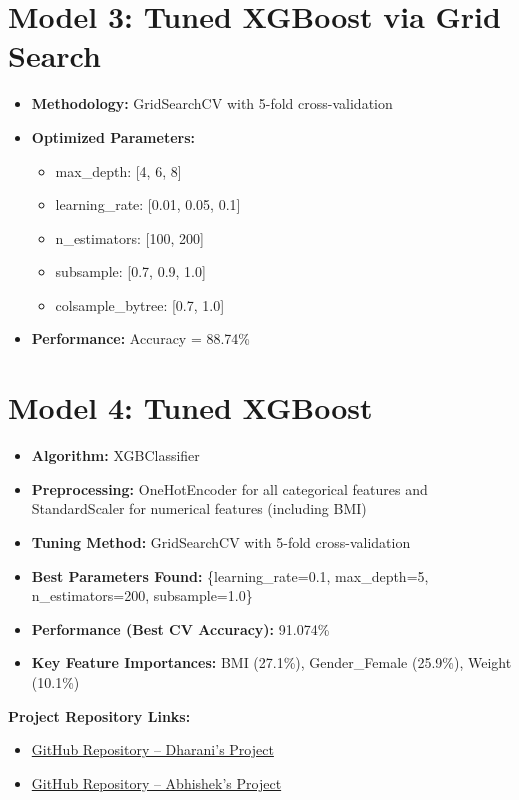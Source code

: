 \documentclass[12pt,a4paper]{report}
\begin{document}
\section{Model 3: Tuned XGBoost via Grid Search}
\begin{itemize}
    \item \textbf{Methodology:} GridSearchCV with 5-fold cross-validation
    \item \textbf{Optimized Parameters:} 
    \begin{itemize}
        \item max\_depth: [4, 6, 8]
        \item learning\_rate: [0.01, 0.05, 0.1]
        \item n\_estimators: [100, 200]
        \item subsample: [0.7, 0.9, 1.0]
        \item colsample\_bytree: [0.7, 1.0]
    \end{itemize}
    \item \textbf{Performance:} Accuracy = 88.74\%
\end{itemize}

\section{Model 4: Tuned XGBoost}
\begin{itemize}
    \item \textbf{Algorithm:} XGBClassifier
    \item \textbf{Preprocessing:} OneHotEncoder for all categorical features and StandardScaler for numerical features (including BMI)
    \item \textbf{Tuning Method:} GridSearchCV with 5-fold cross-validation
    \item \textbf{Best Parameters Found:} \{learning\_rate=0.1, max\_depth=5, n\_estimators=200, subsample=1.0\}
    \item \textbf{Performance (Best CV Accuracy):} 91.074\%
    \item \textbf{Key Feature Importances:} BMI (27.1\%), Gender\_Female (25.9\%), Weight (10.1\%)
\end{itemize}

\noindent\textbf{Project Repository Links:}
\begin{itemize}
    \item \href{https://github.com/dharani070707/Obesity_classification_ML_Project}{GitHub Repository – Dharani's Project}
    \item \href{https://github.com/abhishek-prasanna11/MLProject}{GitHub Repository – Abhishek's Project}
\end{itemize}
\end{document}
